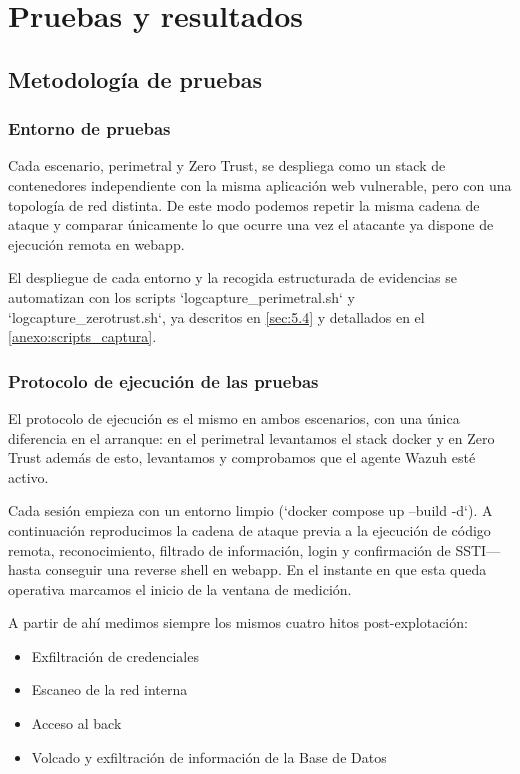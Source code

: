 \documentclass[11pt,spanish,listoffigures,listoftables]{tfgetsinf}
\begin{document}

\chapter{Pruebas y resultados}
\label{sec:6}

    \section{Metodología de pruebas}
    \label{sec:6.1}
        \subsection{Entorno de pruebas}

        Cada escenario, perimetral y Zero Trust, se despliega como un stack de contenedores independiente con la misma aplicación web vulnerable, pero con una topología de red distinta. De este modo podemos repetir la misma cadena de ataque y comparar únicamente lo que ocurre una vez el atacante ya dispone de ejecución remota en webapp.

        El despliegue de cada entorno y la recogida estructurada de evidencias se automatizan con los scripts `logcapture\_perimetral.sh` y `logcapture\_zerotrust.sh`, ya descritos en \cref{sec:5.4} y detallados en el \ref{anexo:scripts_captura}.
        
        \subsection{Protocolo de ejecución de las pruebas}
        El protocolo de ejecución es el mismo en ambos escenarios, con una única diferencia en el arranque: en el perimetral levantamos el stack docker y en Zero Trust además de esto, levantamos y comprobamos que el agente Wazuh esté activo.

        Cada sesión empieza con un entorno limpio (`docker compose up --build -d`). A continuación reproducimos la cadena de ataque previa a la ejecución de código remota, reconocimiento, filtrado de información, login y confirmación de SSTI— hasta conseguir una reverse shell en webapp. En el instante en que esta queda operativa marcamos el inicio de la ventana de medición.
        
        A partir de ahí medimos siempre los mismos cuatro hitos post-explotación:
        \begin{itemize}
            \item Exfiltración de credenciales
            \item Escaneo de la red interna
            \item Acceso al back
            \item Volcado y exfiltración de información de la Base de Datos
        \end{itemize}
        
\end{document}
